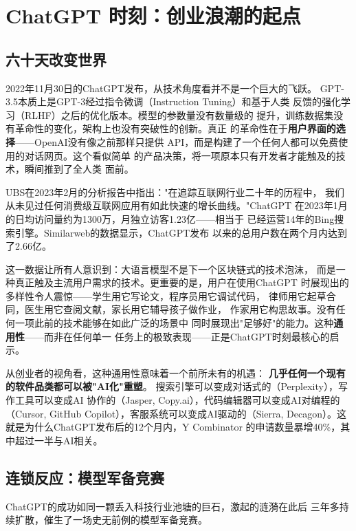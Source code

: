 \section{ChatGPT 时刻：创业浪潮的起点}
\label{sec:overview-chatgpt}

\subsection{六十天改变世界}

2022年11月30日的ChatGPT发布，从技术角度看并不是一个巨大的飞跃。
GPT-3.5本质上是GPT-3经过指令微调（Instruction Tuning）和基于人类
反馈的强化学习（RLHF）之后的优化版本。模型的参数量没有数量级的
提升，训练数据集没有革命性的变化，架构上也没有突破性的创新。真正
的革命性在于\textbf{用户界面的选择}——OpenAI没有像之前那样只提供
API，而是构建了一个任何人都可以免费使用的对话网页。这个看似简单
的产品决策，将一项原本只有开发者才能触及的技术，瞬间推到了全人类
面前。

UBS在2023年2月的分析报告中指出："在追踪互联网行业二十年的历程中，
我们从未见过任何消费级互联网应用有如此快速的增长曲线。"ChatGPT
在2023年1月的日均访问量约为1300万，月独立访客1.23亿——相当于
已经运营14年的Bing搜索引擎。Similarweb的数据显示，ChatGPT发布
以来的总用户数在两个月内达到了2.66亿。

这一数据让所有人意识到：大语言模型不是下一个区块链式的技术泡沫，
而是一种真正触及主流用户需求的技术。更重要的是，用户在使用ChatGPT
时展现出的多样性令人震惊——学生用它写论文，程序员用它调试代码，
律师用它起草合同，医生用它查阅文献，家长用它辅导孩子做作业，
作家用它构思故事。没有任何一项此前的技术能够在如此广泛的场景中
同时展现出"足够好"的能力。这种\textbf{通用性}——而非在任何单一
任务上的极致表现——正是ChatGPT时刻最核心的启示。

从创业者的视角看，这种通用性意味着一个前所未有的机遇：
\textbf{几乎任何一个现有的软件品类都可以被"AI化"重塑}。
搜索引擎可以变成对话式的（Perplexity），写作工具可以变成AI
协作的（Jasper, Copy.ai），代码编辑器可以变成AI对编程的
（Cursor, GitHub Copilot），客服系统可以变成AI驱动的（Sierra,
Decagon）。这就是为什么ChatGPT发布后的12个月内，Y Combinator
的申请数量暴增40\%，其中超过一半与AI相关。

\subsection{连锁反应：模型军备竞赛}

ChatGPT的成功如同一颗丢入科技行业池塘的巨石，激起的涟漪在此后
三年多持续扩散，催生了一场史无前例的模型军备竞赛。


